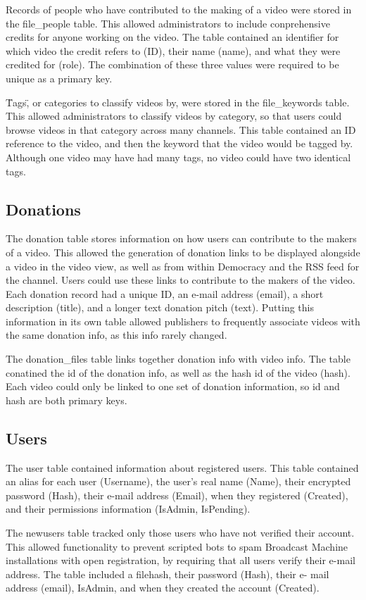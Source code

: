 \documentclass[a4paper,12pt]{report}
\begin{document}
Records of people who have contributed to the making of a video were stored in the file\_people table. This allowed administrators to include conprehensive credits for anyone working on the video. The table contained an identifier for which video the credit refers to (ID), their name (name), and what they were credited for (role). The combination of these three values were required to be unique as a primary key.


\"Tags\", or categories to classify videos by, were stored in the file\_keywords table. This allowed administrators to classify videos by category, so that users could browse videos in that category across many channels. This table contained an ID reference to the video, and then the keyword that the video would be tagged by. Although one video may have had many tags, no video could have two identical tags.


\subsection{Donations}
The donation table stores information on how users can contribute to the makers of a video. This allowed the generation of donation links to be displayed alongside a video in the video view, as well as from within Democracy and the RSS feed for the channel. Users could use these links to contribute to the makers of the video. Each donation record had a unique ID, an e-mail address (email), a short description (title), and a longer text donation pitch (text). Putting this information in its own table allowed publishers to frequently associate videos with the same donation info, as this info rarely changed. 


The donation\_files table links together donation info with video info. The table conatined the id of the donation info, as well as the hash id of the video (hash). Each video could only be linked to one set of donation information, so id and hash are both primary keys.


\subsection{Users}
The user table contained information about registered users. This table contained an alias for each user (Username), the user's real name (Name), their encrypted password (Hash), their e-mail address (Email), when they registered (Created), and their permissions information (IsAdmin, IsPending). 


The newusers table tracked only those users who have not verified their account. This allowed functionality to prevent scripted bots to spam Broadcast Machine installations with open registration, by requiring that all users verify their e-mail address. The table included a filehash, their password (Hash), their e- mail address (email), IsAdmin, and when they created the account (Created).
\end{document}
